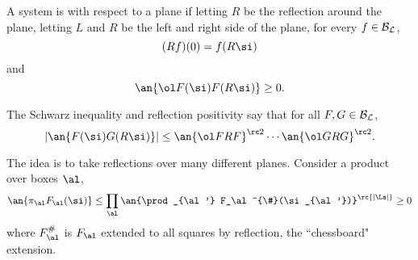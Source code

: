 \begin{df}
A system is  with respect to a plane if letting $R$ be the reflection around the plane, letting $L$ and $R$ be the left and right side of the plane, for every $f\in \cal B_L$,
\[
(Rf)(0) = f(R\si)
\]
and
\[
\an{\ol F(\si)  F(R\si)}\ge 0.
\]
\end{df}
The Schwarz inequality and reflection positivity say that for all $F,G\in \cal B_L$, 
\[
|\an{F(\si)G(R\si)}| \le \an{\ol FRF}^{\rc 2} \cdots \an{\ol GRG}^{\rc 2}.
\]

The idea is to take reflections over many different planes. Consider a product over boxes $\al$,
\[
\an{\pi_\al F_{\al}(\si)} \le \prod_\al\an{\prod_{\al'} F_\al^{\#}(\si_{\al'})}^{\rc{|\La|}}\ge 0
\]
where $F_\al^{\#}$ is $F_\al$ extended to all squares by reflection, the ``chessboard" extension. %
